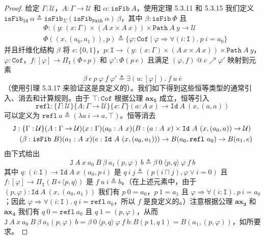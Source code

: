 \documentclass{ctexrep}
\theoremstyle{plain}
\theoremstyle{definition}
\theoremstyle{remark}
\newcommand{\ax}[1]{\mathbf{ax_{#1}}}
\begin{document}
\begin{proof}
给定 $\Gamma : \mathcal{U}$，$A : \Gamma \to \mathcal{U}$ 和 $\alpha : \mathtt{isFib}\ A$，使用定理 5.3.11 和 5.3.15 我们定义 $\mathtt{isFib}_{\mathtt{Id}}\ \alpha \triangleq \mathtt{isFib}_{\Sigma}(\mathtt{isFib}_{\mathtt{Path}}\ \alpha)\ \beta$，其中 $\beta : \mathtt{isFib}\ \Phi$ 且
\begin{align*}
&\Phi : (y : (x : \Gamma) \times (A\ x \times A\ x)) \times \mathtt{Path}\ A\ y \to \mathcal{U} \\
&\Phi((x, (a_0, a_1)), p) \triangleq \{\varphi : \mathtt{Cof} \mid \varphi \Rightarrow \forall(i : \mathtt{I}).\ p\ i = a_0\}
\end{align*}
并且纤维化结构 $\beta$ 将 $e : \{0,1\}$，$p : \mathtt{I} \to (y : (x : \Gamma) \times (A\ x \times A\ x)) \times \mathtt{Path}\ A\ y$，$\varphi : \mathtt{Cof}$，$f : [\varphi] \to \Pi_{\mathtt{I}}(\Phi \circ p)$ 和 $\varphi' : \Phi(p\ e)$ 且满足 $(\varphi, f)\ @\ e \nearrow \varphi'$ 映射到元素
\[
\beta\ e\ p\ \varphi\ f\ \varphi' \triangleq \exists(u : [\varphi]).\ f\ u\ \bar{e}
\]
（使用引理 5.3.17 来验证这是良定义的）。我们如下得到这些恒等类型的通常引入、消去和计算规则。由于 $\top : \mathtt{Cof}$ 根据公理 $\ax{5}$ 成立，恒等引入
\begin{equation}
\mathtt{refl} : \{\Gamma : \mathcal{U}\}\{A : \Gamma \to \mathcal{U}\}\{x : \Gamma\}(a : A\ x) \to \mathtt{Id}\ A\ (x, (a, a))
\end{equation}
可以定义为 $\mathtt{refl}\ a \triangleq (\lambda a\ i \to a, \top)$。恒等消去
\begin{align}
&\mathtt{J} : \{\Gamma : \mathcal{U}\}(A : \Gamma \to \mathcal{U})(x : \Gamma)(a_0 : A\ x)(B : (a : A\ x) \times \mathtt{Id}\ A\ (x, (a_0, a)) \to \mathcal{U}) \\
&\quad(\beta : \mathtt{isFib}\ B)(a_1 : A\ x)(e : \mathtt{Id}\ A\ (x, (a_0, a_1))) \to B(a_0, \mathtt{refl}\ a_0) \to B(a_1, e) \notag
\end{align}
由下式给出
\[
\mathtt{J}\ A\ x\ a_0\ B\ \beta\ a_1(p, \varphi)\ b \triangleq \beta\ 0\ \langle p, q\rangle\ \varphi\ f\ b
\]
其中 $q : (i : \mathtt{I}) \to \mathtt{Id}\ A\ x\ (a_0, p\ i)$ 是 $q\ i\ j \triangleq (p(i \sqcap j), \varphi \lor i = 0)$ 且 $f : [\varphi] \to \Pi_{\mathtt{I}}(B \circ \langle p, q\rangle)$ 是 $f\ u\ i \triangleq b$。（在上述元素中，由于 $(p, \varphi) : \mathtt{Id}\ A\ (x, (a_0, a_1))$ 我们有 $p\ 0 = a_0$，$p\ 1 = a_1$ 且 $\varphi \Rightarrow \forall(i : \mathtt{I}).\ p\ i = a_0$；因此 $\varphi \Rightarrow \forall(i : \mathtt{I}).\ q\ i = \mathtt{refl}\ a_0$，所以 $f$ 是良定义的。）注意根据公理 $\ax{3}$ 和 $\ax{4}$ 我们有 $q\ 0 = \mathtt{refl}\ a_0$ 且 $q\ 1 = (p, \varphi)$，从而 $\mathtt{J}\ A\ x\ a_0\ B\ \beta\ a_1(p, \varphi)\ b = \beta\ 0\ \langle p, q\rangle\ \varphi\ f\ b : B(p\ 1, q\ 1) = B(a_1, (p, \varphi))$，如所要求。


\end{proof}
\end{document}
